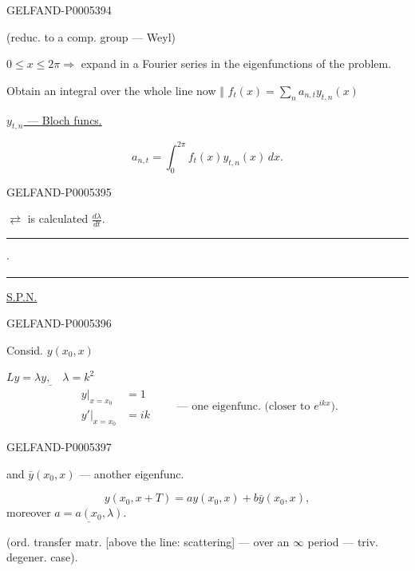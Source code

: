 \begin{GelfandAdjacentEvidence}{GELFAND-P000539}{4}


(reduc. to a comp. group — Weyl)

$0\le x\le2\pi\Rightarrow$ expand in a Fourier series in the eigenfunctions of the problem.

Obtain an integral over the whole line now \(\big\Vert\)
\(\displaystyle f_t(x)=\sum_n a_{n,t}y_{t,n}(x)\)

\hfill\uline{\mbox{$y_{t,n}$} — Bloch funcs.}\par
\[
a_{n,t}=\int_0^{2\pi}f_t(x)y_{t,n}(x)\,dx.
\]
\end{GelfandAdjacentEvidence}
\begin{GelfandAdjacentEvidence}{GELFAND-P000539}{5}


\(\rightleftarrows\) is calculated \(\displaystyle\frac{d\lambda}{dt}\).

\hfill\rule{1.1cm}{.35pt}\enspace\(\cdot\)\enspace\rule{1.55cm}{.35pt}\par

\uline{S.P.N.}
\end{GelfandAdjacentEvidence}
\begin{GelfandAdjacentEvidence}{GELFAND-P000539}{6}


Consid. \(y(x_0,x)\)

\(\underline{Ly=\lambda y,\quad\lambda=k^2}\)
\[
\begin{aligned}
y|_{x=x_0}&=1\\
y'|_{x=x_0}&=ik
\end{aligned}
\qquad\text{— one eigenfunc. (closer to }e^{ikx}\text{).}
\]
\end{GelfandAdjacentEvidence}
\begin{GelfandAdjacentEvidence}{GELFAND-P000539}{7}

and \(\bar y(x_0,x)\) — another eigenfunc.

\[
y(x_0,x+T)=ay(x_0,x)+b\bar y(x_0,x),
\]
moreover \(\underline{a=a(x_0,\lambda)}\).

(ord. transfer matr. [above the line: scattering] — over an \(\infty\) period — triv. degener. case).
\end{GelfandAdjacentEvidence}
